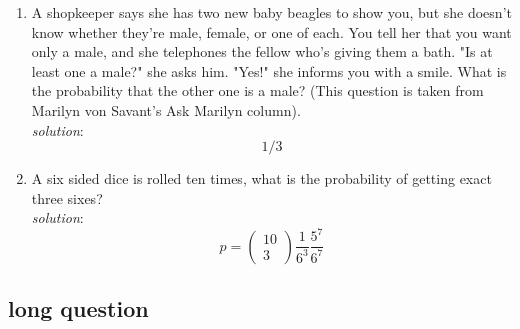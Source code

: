 \documentclass[11pt,a4paper]{scrartcl}
\begin{document}
\begin{enumerate}
\item A shopkeeper says she has two new baby beagles to show you,
but she doesn't know whether they're male, female, or one of each. You
tell her that you want only a male, and she telephones the fellow
who's giving them a bath. "Is at least one a male?" she asks
him. "Yes!" she informs you with a smile. What is the probability that
the other one is a male?  (This question is taken from Marilyn von
Savant's Ask Marilyn column).
\\ \textsl{solution}: 
$$1/3$$

\item A six sided dice is rolled ten times, what is the probability of getting exact three sixes?
\\ \textsl{solution}: 
$$
p=\left(\begin{array}{c}10\\3\end{array}\right)\frac{1}{6^3}\frac{5^7}{6^7}
$$

\end{enumerate}

\subsection*{long question}
\end{document}
